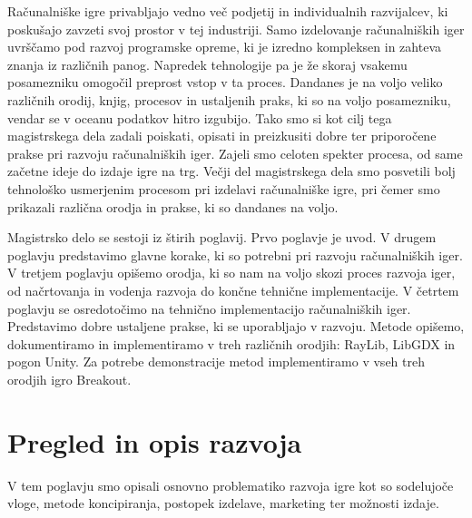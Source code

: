 \documentclass[12pt,a4paper,twoside]{book}
\begin{document}
Računalniške igre privabljajo vedno več podjetij in individualnih razvijalcev, ki poskušajo zavzeti svoj prostor v tej industriji. Samo izdelovanje računalniških iger uvrščamo pod razvoj programske opreme, ki je izredno kompleksen in zahteva znanja iz različnih panog. Napredek tehnologije pa je že skoraj vsakemu posamezniku omogočil preprost vstop v ta proces. Dandanes je na voljo veliko različnih orodij, knjig, procesov in ustaljenih praks, ki so na voljo posamezniku, vendar se v oceanu podatkov hitro izgubijo. Tako smo si kot cilj tega magistrskega dela zadali poiskati, opisati in preizkusiti dobre ter priporočene prakse pri razvoju računalniških iger. Zajeli smo celoten spekter procesa, od same začetne ideje do izdaje igre na trg. Večji del magistrskega dela smo posvetili bolj tehnološko usmerjenim procesom pri izdelavi računalniške igre, pri čemer smo prikazali različna orodja in prakse, ki so dandanes na voljo.

Magistrsko delo se sestoji iz štirih poglavij. Prvo poglavje je uvod. V drugem poglavju predstavimo glavne korake, ki so potrebni pri razvoju računalniških iger. V tretjem poglavju opišemo orodja, ki so nam na voljo skozi proces razvoja iger, od načrtovanja in vodenja razvoja do končne tehnične implementacije. V četrtem poglavju se osredotočimo na tehnično implementacijo računalniških iger. Predstavimo dobre ustaljene prakse, ki se uporabljajo v razvoju. Metode opišemo, dokumentiramo in implementiramo v treh različnih orodjih: RayLib, LibGDX in pogon Unity. Za potrebe demonstracije metod implementiramo v vseh treh orodjih igro Breakout.

\chapter{Pregled in opis razvoja}\thispagestyle{fancy}
V tem poglavju smo opisali osnovno problematiko razvoja igre kot so sodelujoče vloge, metode koncipiranja, postopek izdelave, marketing ter možnosti izdaje.
\end{document}
